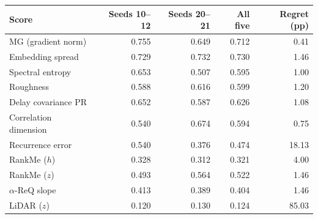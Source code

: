 \begin{tabular}{lrrrr}
\toprule
Score & Seeds 10--12 & Seeds 20--21 & All five & Regret (pp) \\
\midrule
MG (gradient norm) & 0.755 & 0.649 & 0.712 & 0.41 \\
Embedding spread & 0.729 & 0.732 & 0.730 & 1.46 \\
Spectral entropy & 0.653 & 0.507 & 0.595 & 1.00 \\
Roughness & 0.588 & 0.616 & 0.599 & 1.20 \\
Delay covariance PR & 0.652 & 0.587 & 0.626 & 1.08 \\
Correlation dimension & 0.540 & 0.674 & 0.594 & 0.75 \\
Recurrence error & 0.540 & 0.376 & 0.474 & 18.13 \\
RankMe ($h$) & 0.328 & 0.312 & 0.321 & 4.00 \\
RankMe ($z$) & 0.493 & 0.564 & 0.522 & 1.46 \\
$\alpha$-ReQ slope & 0.413 & 0.389 & 0.404 & 1.46 \\
LiDAR ($z$) & 0.120 & 0.130 & 0.124 & 85.03 \\
\bottomrule
\end{tabular}
